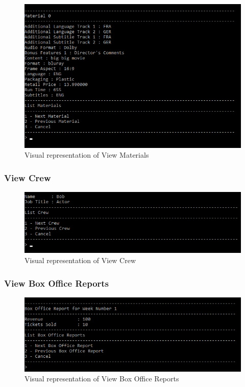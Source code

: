 \documentclass[
  english,
  a4paper,
,tablecaptionabove
]{scrartcl}
\begin{document}
\begin{figure}
\centering
\includegraphics{images/ui-screenshots/list-projects-view-materials.png}
\caption{Visual representation of View Materials}
\end{figure}

\newpage

\hypertarget{view-crew}{%
\subsubsection{View Crew}\label{view-crew}}

\begin{figure}
\centering
\includegraphics{images/ui-screenshots/list-projects-view-crew.png}
\caption{Visual representation of View Crew}
\end{figure}

\newpage

\hypertarget{view-box-office-reports}{%
\subsubsection{View Box Office Reports}\label{view-box-office-reports}}

\begin{figure}
\centering
\includegraphics{images/ui-screenshots/list-projects-view-box-office-reports.png}
\caption{Visual representation of View Box Office Reports}
\end{figure}
\end{document}
